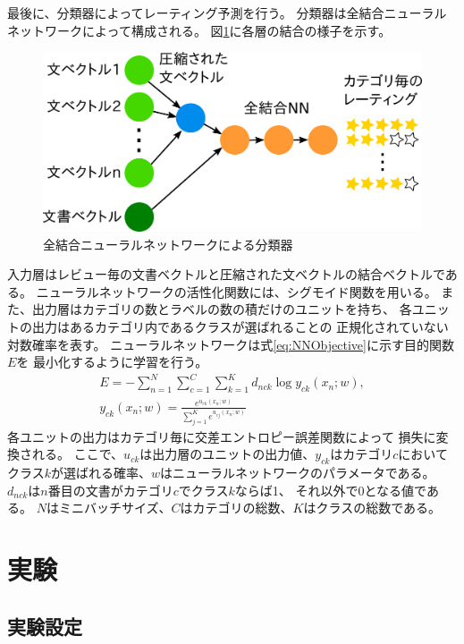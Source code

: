 \documentclass{ttithesis}
\begin{document}
最後に、分類器によってレーティング予測を行う。
分類器は全結合ニューラルネットワークによって構成される。
図\ref{fig:MyModel}に各層の結合の様子を示す。
\begin{figure}[t!]
  \includegraphics{fig/model.png}
  \caption{全結合ニューラルネットワークによる分類器}
  \label{fig:MyModel}
\end{figure}
入力層はレビュー毎の文書ベクトルと圧縮された文ベクトルの結合ベクトルである。
ニューラルネットワークの活性化関数には、シグモイド関数を用いる。
また、出力層はカテゴリの数とラベルの数の積だけのユニットを持ち、
各ユニットの出力はあるカテゴリ内であるクラスが選ばれることの
正規化されていない対数確率を表す。
ニューラルネットワークは式\ref{eq:NNObjective}に示す目的関数$E$を
最小化するように学習を行う。
\begin{gather}
  E = - \sum^{N}_{n = 1} \sum^{C}_{c = 1} \sum^{K}_{k = 1}
        d_{nck} \log{y_{ck}(x_n; w)},
  \label{eq:NNObjective} \\
  y_{ck}(x_n; w) = \frac{e^{u_{ck}(x_n; w)}}
                        {\sum^{K}_{j = 1} e^{u_{cj}(x_n; w)}} \nonumber
\end{gather}
各ユニットの出力はカテゴリ毎に交差エントロピー誤差関数によって
損失に変換される。
ここで、$u_{ck}$は出力層のユニットの出力値、$y_{ck}$はカテゴリ$c$において
クラス$k$が選ばれる確率、$w$はニューラルネットワークのパラメータである。
$d_{nck}$は$n$番目の文書がカテゴリ$c$でクラス$k$ならば1、
それ以外で0となる値である。
$N$はミニバッチサイズ、$C$はカテゴリの総数、$K$はクラスの総数である。


\section{実験}

\subsection{実験設定}
\end{document}
